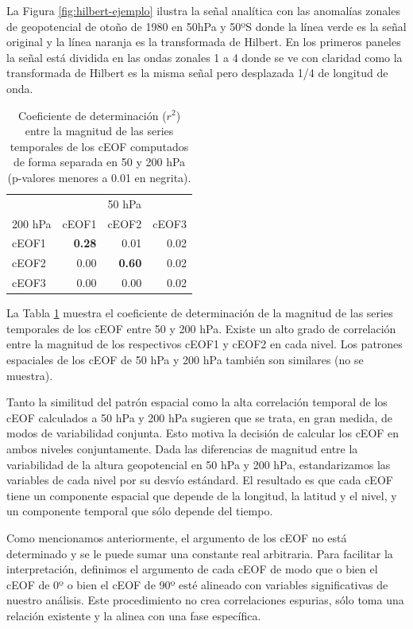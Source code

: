 \documentclass[12pt,oneside]{reedthesis}
\begin{document}
La Figura \ref{fig:hilbert-ejemplo} ilustra la señal analítica con las anomalías zonales de geopotencial de otoño de 1980 en 50hPa y 50ºS donde la línea verde es la señal original y la línea naranja es la transformada de Hilbert.
En los primeros paneles la señal está dividida en las ondas zonales 1 a 4 donde se ve con claridad como la transformada de Hilbert es la misma señal pero desplazada 1/4 de longitud de onda.



\begin{table}

\caption{\label{tab:corr-ceof-splitted}Coeficiente de determinación (\(r^2\)) entre la magnitud de las series temporales de los cEOF computados de forma separada en 50 y 200 hPa (p-valores menores a 0.01 en negrita).}
\centering
\begin{tabular}[t]{l>{}r>{}r>{}r}
\toprule
\multicolumn{1}{c}{} & \multicolumn{3}{c}{50 hPa} \\
\cmidrule(l{3pt}r{3pt}){2-4}
200 hPa & cEOF1 & cEOF2 & cEOF3\\
\midrule
cEOF1 & \textbf{0.28} & 0.01 & 0.02\\
cEOF2 & 0.00 & \textbf{0.60} & 0.02\\
cEOF3 & 0.00 & 0.00 & 0.02\\
\bottomrule
\end{tabular}
\end{table}

La Tabla \ref{tab:corr-ceof-splitted} muestra el coeficiente de determinación de la magnitud de las series temporales de los cEOF entre 50 y 200 hPa.
Existe un alto grado de correlación entre la magnitud de los respectivos cEOF1 y cEOF2 en cada nivel.
Los patrones espaciales de los cEOF de 50 hPa y 200 hPa también son similares (no se muestra).

Tanto la similitud del patrón espacial como la alta correlación temporal de los cEOF calculados a 50 hPa y 200 hPa sugieren que se trata, en gran medida, de modos de variabilidad conjunta.
Esto motiva la decisión de calcular los cEOF en ambos niveles conjuntamente.
Dada las diferencias de magnitud entre la variabilidad de la altura geopotencial en 50 hPa y 200 hPa, estandarizamos las variables de cada nivel por su desvío estándard.
El resultado es que cada cEOF tiene un componente espacial que depende de la longitud, la latitud y el nivel, y un componente temporal que sólo depende del tiempo.

Como mencionamos anteriormente, el argumento de los cEOF no está determinado y se le puede sumar una constante real arbitraria.
Para facilitar la interpretación, definimos el argumento de cada cEOF de modo que o bien el cEOF de 0º o bien el cEOF de 90º esté alineado con variables significativas de nuestro análisis.
Este procedimiento no crea correlaciones espurias, sólo toma una relación existente y la alinea con una fase específica.
\end{document}

